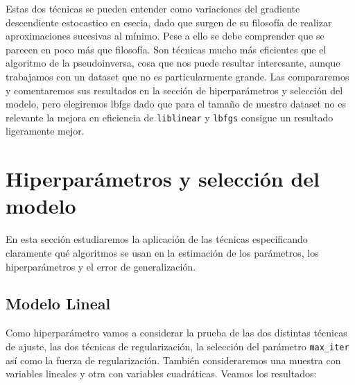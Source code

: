 \documentclass[11pt,a4paper]{article}
\begin{document}
Estas dos técnicas se pueden entender como variaciones del gradiente descendiente estocastico en esecia, dado que surgen de su filosofía de realizar aproximaciones sucesivas al mínimo. Pese a ello se debe comprender que se parecen en poco más que filosofía. Son técnicas mucho más eficientes que el algoritmo de la pseudoinversa, cosa que nos puede resultar interesante, aunque trabajamos con un dataset que no es particularmente grande. Las compararemos y comentaremos sus resultados  en la sección de hiperparámetros y selección del modelo, pero elegiremos lbfgs dado que para el tamaño de nuestro dataset no es relevante la mejora en eficiencia de \texttt{liblinear} y \texttt{lbfgs} consigue un resultado ligeramente mejor.


\section{Hiperparámetros y selección del modelo}
 En esta sección estudiaremos la aplicación de las técnicas especificando claramente qué algoritmos se usan en la estimación de los parámetros, los hiperparámetros y el error de generalización.
 
\subsection{Modelo Lineal}

Como hiperparámetro vamos a considerar la prueba de las dos distintas técnicas de ajuste, las dos técnicas de regularización, la selección del parámetro \texttt{max\_iter} así como la fuerza de regularización. También consideraremos una muestra con variables lineales y otra con variables cuadráticas. Veamos los resultados:\\
\end{document}
